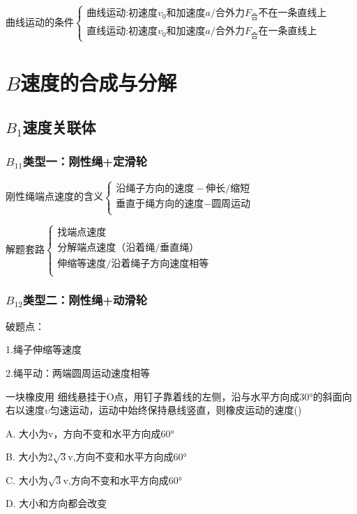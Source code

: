 \documentclass[lang=cn,10pt]{elegantbook}
\begin{document}
        $\text{曲线运动的条件}\begin{cases}\text{曲线运动:初速度}v_0\text{和加速度}a/\text{合外力}F_\text{合}\text{不在一条直线上}\\\text{直线运动:初速度}v_0\text{和加速度}a/\text{合外力}F_\text{合}\text{在一条直线上}&\end{cases}$
        \section{$B$速度的合成与分解}
        \subsection{$B_1$速度关联体}
        \subsubsection{$B_{11}$类型一：刚性绳+定滑轮}
        刚性绳端点速度的含义$\begin{cases}
        	\text{沿绳子方向的速度}-\text{伸长}/\text{缩短}\\
        	\text{垂直于绳方向的速度}-\text{圆周运动}\\
        \end{cases}
        $
        
        解题套路$ \begin{cases}
        	\text{找端点速度}\\
        	\text{分解端点速度（沿着绳/垂直绳）}\\
        	\text{伸缩等速度/沿着绳子方向速度相等 }\\
        \end{cases}$
        \subsubsection{$B_{12}$类型二：刚性绳+动滑轮}
        
        破题点：
        
        1.绳子伸缩等速度
        
        2.绳平动：两端圆周运动速度相等
        
        \begin{example}
        	一块橡皮用 细线悬挂于O点，用钉子靠着线的左侧，沿与水平方向成30°的斜面向右以速度$\upsilon$匀速运动，运动中始终保持悬线竖直，则橡皮运动的速度()
        	
        	A. 大小为v，方向不变和水平方向成60°
        	
        	B. 大小为2$\sqrt3$v,方向不变和水平方向成60° 
        	
        	C. 大小为$\sqrt3$v,方向不变和水平方向成60° 
        	
        	D. 大小和方向都会改变
        \end{example}
\end{document}
